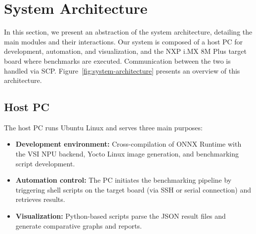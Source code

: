 \section{System Architecture}
In this section, we present an abstraction of the system architecture, detailing the main modules and their interactions. Our system is composed of a host PC for development, automation, and visualization, and the NXP i.MX 8M Plus target board where benchmarks are executed. Communication between the two is handled via SCP. Figure~\ref{fig:system-architecture} presents an overview of this architecture.


\subsection{Host PC}
The host PC runs Ubuntu Linux and serves three main purposes:
\begin{itemize}
    \item \textbf{Development environment:} Cross-compilation of ONNX Runtime with the VSI NPU backend, Yocto Linux image generation, and benchmarking script development.
    \item \textbf{Automation control:} The PC initiates the benchmarking pipeline by triggering shell scripts on the target board (via SSH or serial connection) and retrieves results.
    \item \textbf{Visualization:} Python-based scripts parse the JSON result files and generate comparative graphs and reports.
\end{itemize}

